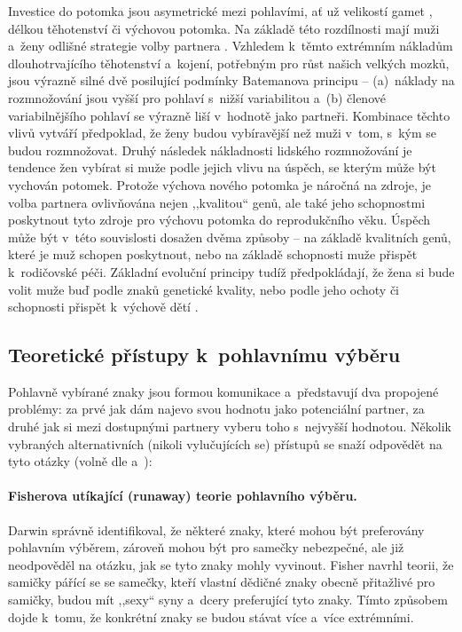 \documentclass[a4paper, 12pt, notitlepage, oneside, numbers=noenddot]{report}
\begin{document}
Investice do potomka jsou asymetrické mezi pohlavími, ať už velikostí
gamet \citep{Dawkins1998}, délkou těhotenství či výchovou potomka.  Na
základě této rozdílnosti mají muži a~ženy odlišné strategie volby
partnera \citep{BussSchmitt1993}.  Vzhledem k~těmto ex\-trém\-ním
nákladům dlouhotrvajícího těhotenství a~kojení, potřebným pro růst
našich velkých mozků, jsou výrazně silné dvě posilující podmínky
Batemanova principu -- (a)~náklady na roz\-mno\-žo\-vá\-ní jsou vyšší
pro pohlaví s~nižší variabilitou a~(b) členové variabilnějšího pohlaví
se výrazně liší v~hodnotě jako partneři.  Kombinace těchto vlivů
vytváří předpoklad, že ženy budou vybíravější než muži v~tom, s~kým se
budou rozmnožovat.  Druhý následek nákladnosti lidského rozmnožování
je tendence žen vybírat si muže podle jejich vlivu na úspěch, se
kterým může být vychován potomek.  Protože výchova nového potomka je
náročná na zdroje, je volba partnera ovlivňována nejen ,,kvalitou``
genů, ale také jeho schopnostmi poskytnout tyto zdroje pro výchovu
potomka do reprodukčního věku.  Úspěch může být v~této souvislosti
dosažen dvěma způsoby -- na základě kvalitních genů, které je muž
schopen poskytnout, nebo na základě schopnosti muže přispět
k~rodičovské péči.  Základní evoluční principy tudíž předpokládají, že
žena si bude volit muže buď podle znaků genetické kvality, nebo podle
jeho ochoty či schopnosti přispět k~výchově dětí
\citep{BarrettDunbarLycett2007}.

\subsection{Teoretické přístupy k~pohlavnímu výběru}
Pohlavně vybírané znaky jsou formou komunikace a~představují dva
propojené problémy: za prvé jak dám najevo svou hodnotu jako
potenciální partner, za druhé jak si mezi dostupnými partnery
vyberu toho s~nejvyšší hodnotou.  Několik vybraných alternativních
(nikoli vylučujících se) přístupů se snaží odpovědět na tyto otázky
(volně dle \citealp{Barber1995} a~\citealp{Ridley2007}):

\paragraph{Fisherova utíkající (runaway) teorie pohlavního výběru.}
Darwin správně identifikoval, že některé znaky, které mohou být
preferovány pohlavním výběrem, zároveň mohou být pro samečky
nebezpečné, ale již neodpověděl na otázku, jak se tyto znaky mohly
vyvinout.  Fisher navrhl teorii, že samičky pářící se se samečky,
kteří vlastní dědičné znaky obecně přitažlivé pro samičky, budou mít
,,sexy`` syny a~dcery preferující tyto znaky.  Tímto způsobem dojde
k~tomu, že konkrétní znaky se budou stávat více a~více extrémními.
\end{document}
